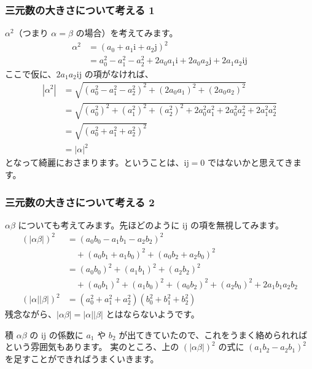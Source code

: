 \documentclass{beamer}
\newcommand{\ii}{\mathrm{i}}
\newcommand{\jj}{\mathrm{j}}
\begin{document}
\begin{frame}
    \frametitle{三元数の大きさについて考える 1}

    \(\alpha^2\)（つまり \(\alpha = \beta\) の場合）を考えてみます。
    \begin{align*}
        \alpha^2 & = (a_0 + a_1 \ii + a_2 \jj)^2                                               \\
                 & = a_0^2 - a_1^2 - a_2^2 + 2 a_0 a_1 \ii + 2 a_0 a_2 \jj + 2 a_1 a_2 \ii \jj
    \end{align*}
    ここで仮に、\(2 a_1 a_2 \ii \jj\) の項がなければ、
    \begin{align*}
        |\alpha^2| & = \sqrt{(a_0^2 - a_1^2 - a_2^2)^2 + (2 a_0 a_1)^2 + (2 a_0 a_2)^2}                        \\
                   & = \sqrt{(a_0^2)^2 + (a_1^2)^2 + (a_2^2)^2 + 2 a_0^2 a_1^2 + 2 a_0^2 a_2^2 + 2a_1^2 a_2^2} \\
                   & = \sqrt{(a_0^2 + a_1^2 + a_2^2)^2}                                                        \\
                   & = |\alpha|^2
    \end{align*}
    となって綺麗におさまります。ということは、\(\ii \jj = 0\) ではないかと思えてきます。
\end{frame}

\begin{frame}
    \frametitle{三元数の大きさについて考える 2}

    \(\alpha \beta\) についても考えてみます。先ほどのように \(\ii \jj\) の項を無視してみます。
    \begin{align*}
        (|\alpha \beta|)^2   & = (a_0 b_0 - a_1 b_1 - a_2 b_2)^2                                                 \\
                             & \quad + (a_0 b_1 + a_1 b_0)^2 + (a_0 b_2 + a_2 b_0)^2                             \\
                             & = (a_0 b_0)^2 + (a_1 b_1)^2 + (a_2 b_2)^2                                         \\
                             & \quad + (a_0 b_1)^2 + (a_1 b_0)^2 + (a_0 b_2)^2 + (a_2 b_0)^2 + 2 a_1 b_1 a_2 b_2 \\
        (|\alpha| |\beta|)^2 & = (a_0^2 + a_1^2 + a_2^2)(b_0^2 + b_1^2 + b_2^2)
    \end{align*}
    残念ながら、\(|\alpha \beta| = |\alpha| |\beta|\) とはならないようです。

    \bigskip

    積 \(\alpha \beta\) の \(\ii \jj\) の係数に \(a_1\) や \(b_2\) が出てきていたので、これをうまく絡められればという雰囲気もあります。
    実のところ、上の \((|\alpha \beta|)^2\) の式に \((a_1 b_2 - a_2 b_1)^2\) を足すことができればうまくいきます。
\end{frame}
\end{document}
